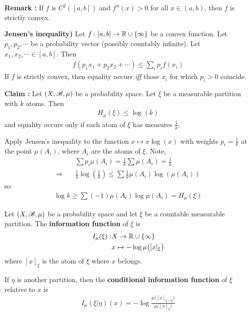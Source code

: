 \documentclass[10pt,a4paper]{report}
\newenvironment{proof}
{\begin{changemargin}{1cm}{0.5cm} 
	}%
	{\end{changemargin}
}
\begin{document}
\textbf{Remark :} If $f$ is $C^2([a,b])$ and $f''(x) >0$ for all $x\in (a,b)$, then $f$ is strictly convex.
\s

\textbf{Jensen's inequality)} Let $f:[a,b] \rightarrow \mathbb{R} \cup \{\infty\}$ be a convex function. Let $p_1, p_2, \cdots$ be a probability vector (possibly countably infinite). Let $x_1, x_2, \cdots \in [a,b]$. Then
\begin{align*}
f(p_1 x_1 + p_2 x_2 + \cdots) \leq \sum_i p_i f(x_i)
\end{align*}
If $f$ is strictly convex, then equality occurs \emph{iff} those $x_i$ for which $p_i >0$ coincide.
\s

\textbf{Claim :} Let $(X,\mathscr{B}, \mu)$ be a probability space. Let $\xi$ be a measurable partition with $k$ atoms. Then
\begin{align*}
H_{\mu}(\xi) \leq \log (k)
\end{align*}
and equality occurs only if each atom of $\xi$ has measures $\frac{1}{k}$.
\begin{proof}
\pf Apply Jensen's inequality to the function $x\mapsto x \log (x)$ with weights $p_i = \frac{1}{k}$ at the point $\mu(A_i)$, where $A_i$ are the atoms of $\xi$. Note,
\begin{align*}
& \sum p_i \mu(A_i) = \frac{1}{k} \sum \mu(A_i) = \frac{1}{k} \\
\Rightarrow \quad & \frac{1}{k} \log (\frac{1}{k}) \leq \sum \frac{1}{k} \mu(A_i) \log (\mu(A_i))
\end{align*}
so
\begin{align*}
\log k \geq \sum (-1) \mu(A_i) \log \mu(A_i) = H_{\mu}(\xi)
\end{align*}

\eop
\end{proof}

\s

 Let $(X, \mathscr{B}, \mu)$ be a probability space and let $\xi$ be a countable measurable partition. The \textbf{information function} of $\xi$ is
\begin{align*}
I_{\mu} (\xi) : & X \rightarrow \mathbb{R} \cup \{\infty \} \\
& x\mapsto -\log \mu \big( [x]_{\xi} \big)
\end{align*}
where $[x]_{\xi}$ is the atom of $\xi$ where $x$ belongs.

\quad If $\eta$ is another partition, then the \textbf{conditional information function} of $\xi$ relative to $x$ is
\begin{align*}
I_{\mu} (\xi | \eta) (x)  = - \log \frac{\mu \big( [x]_{\xi \vee \eta} \big)}{\mu \big( [x]_{\eta} \big)}
\end{align*}
\s
\end{document}
